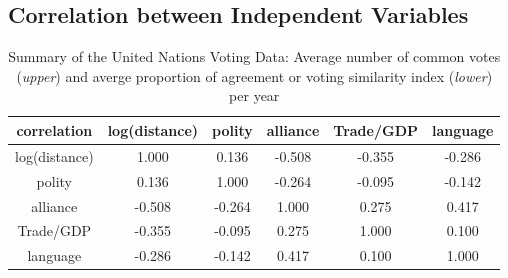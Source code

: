 \documentclass[a4paper]{article}
\begin{document}
\begin{appendices}
\section{Correlation between Independent Variables}\label{appendix: correlations}
\begin{table}[ht]
	\centering
	\begin{tabular}{ |c|ccccc|} 
		\hline
	correlation & 	log(distance) & polity &   alliance &  Trade/GDP  &  language\\
	 \hline
			log(distance)& 1.000& 0.136&  -0.508&-0.355&-0.286\\
			polity&0.136&1.000& -0.264&-0.095&-0.142\\
			alliance& -0.508&-0.264&1.000&0.275& 0.417\\
			Trade/GDP&  -0.355& -0.095& 0.275& 1.000& 0.100\\
			language& -0.286&-0.142& 0.417& 0.100& 1.000\\
					\hline
	\end{tabular}
	\caption {Summary of the United Nations Voting Data: Average number of common votes (\textit{upper}) and averge proportion of agreement or voting similarity index (\textit{lower}) per year}
	\label{table:correlation}
\end{table}

\end{appendices}
\end{document}
